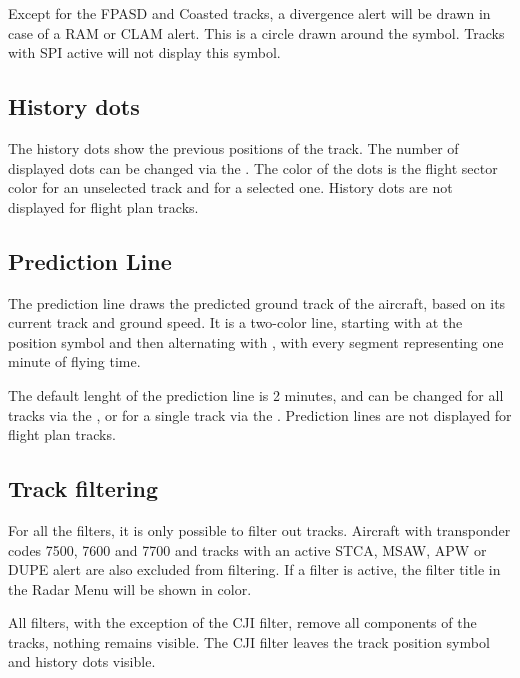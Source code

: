 \documentclass[a4paper,oneside,11pt]{memoir}
\begin{document}
\bigskip

Except for the FPASD and Coasted tracks, a divergence alert will be drawn in case of a RAM or CLAM alert. This is a circle drawn around the symbol. Tracks with SPI active will not display this symbol.

\subsection{History dots}

The history dots show the previous positions of the track. The number of displayed dots can be changed via the . The color of the dots is the flight sector color for an unselected track and  for a selected one. History dots are not displayed for flight plan tracks.

\subsection{Prediction Line}

The prediction line draws the predicted ground track of the aircraft, based on its current track and ground speed. It is a two-color line, starting with  at the position symbol and then alternating with , with every segment representing one minute of flying time. 

The default lenght of the prediction line is 2 minutes, and can be changed for all tracks via the , or for a single track via the . Prediction lines are not displayed for flight plan tracks.


\subsection{Track filtering}\label{win:tf}

For all the filters, it is only possible to filter out  tracks. Aircraft with transponder codes 7500, 7600 and 7700 and tracks with an active STCA, MSAW, APW or DUPE alert are also excluded from filtering. If a filter is active, the filter title in the Radar Menu will be shown in  color.

\bigskip

All filters, with the exception of the CJI filter, remove all components of the tracks, nothing remains visible. The CJI filter leaves the track position symbol and history dots visible.
\end{document}
